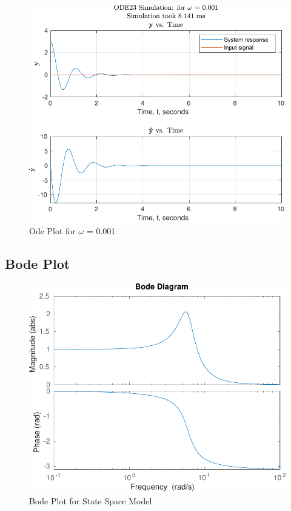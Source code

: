 \documentclass[12pt]{article}
\begin{document}
		\begin{figure}[H]
			\centering
			\includegraphics[width=1\linewidth]{Code/Fig/ode_sin_input_0.001}
			\caption{Ode Plot for $\omega$ = 0.001}
			\label{fig:odesininput0001}
		\end{figure}		
	
		\subsection{Bode Plot}
	
		
		
		\begin{figure}[H]
			\centering
			\includegraphics[width=1\linewidth]{Code/Fig/bode_plot}
			\caption{Bode Plot for State Space Model}
			\label{fig:bodeplot}
		\end{figure}
	
\end{document}

